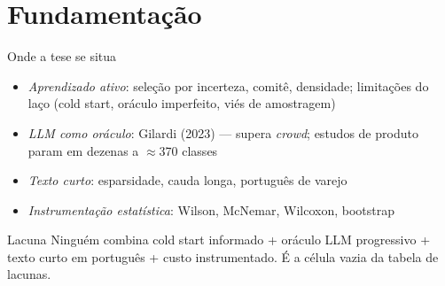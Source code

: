 \documentclass[aspectratio=169,11pt]{beamer}
\begin{document}
\section{Fundamentação}
\begin{frame}{Onde a tese se situa}
\begin{itemize}
  \item \emph{Aprendizado ativo}: seleção por incerteza, comitê, densidade;
        limitações do laço (cold start, oráculo imperfeito, viés de amostragem)
  \item \emph{LLM como oráculo}: Gilardi (2023) --- supera \textit{crowd};
        estudos de produto param em dezenas a $\approx$370 classes
  \item \emph{Texto curto}: esparsidade, cauda longa, português de varejo
  \item \emph{Instrumentação estatística}: Wilson, McNemar, Wilcoxon, bootstrap
\end{itemize}
\vspace{0.3em}
\begin{block}{Lacuna}
\footnotesize Ninguém combina cold start informado + oráculo LLM progressivo +
texto curto em português + custo instrumentado. É a célula vazia da tabela de lacunas.
\end{block}
\end{frame}


\end{document}
